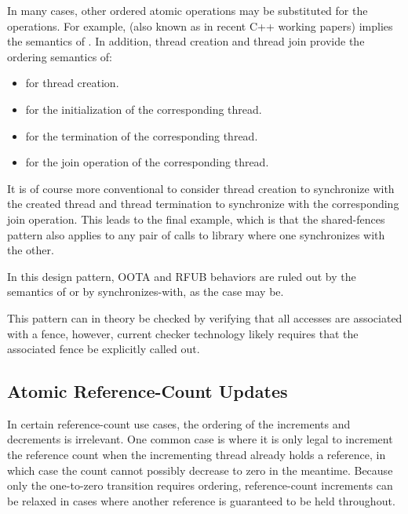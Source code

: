 \documentclass[10]{article}
\begin{document}
In many cases, other ordered atomic operations may be substituted for
the  operations.
For example, 
(also known as  in recent C++ working papers) implies
the semantics of .
In addition, thread creation and thread join provide the ordering
semantics of:

\begin{itemize}
\item	{} for thread creation.
\item	{} for the initialization of the
	corresponding thread.
\item	{} for the termination of the
	corresponding thread.
\item	{} for the join operation
	of the corresponding thread.
\end{itemize}

It is of course more conventional to consider thread creation to
synchronize with the created thread and thread termination to synchronize
with the corresponding join operation.
This leads to the final example, which is that the shared-fences pattern
also applies to any pair of calls to library where one synchronizes with
the other.

In this design pattern, OOTA and RFUB behaviors are ruled out by the semantics
of  or by synchronizes-with, as the case may be.

This pattern can in theory be checked by verifying that all accesses
are associated with a fence, however, current checker technology likely
requires that the associated fence be explicitly called out.

\subsection{Atomic Reference-Count Updates}
\label{sec:Atomic Reference-Count Updates}

In certain reference-count use cases, the ordering of the increments and
decrements is irrelevant.
One common case is where it is only legal to increment the reference
count when the incrementing thread already holds a reference, in which
case the count cannot possibly decrease to zero in the meantime.
Because only the one-to-zero transition requires ordering, reference-count
increments can be relaxed in cases where another reference is guaranteed
to be held throughout.
\end{document}
